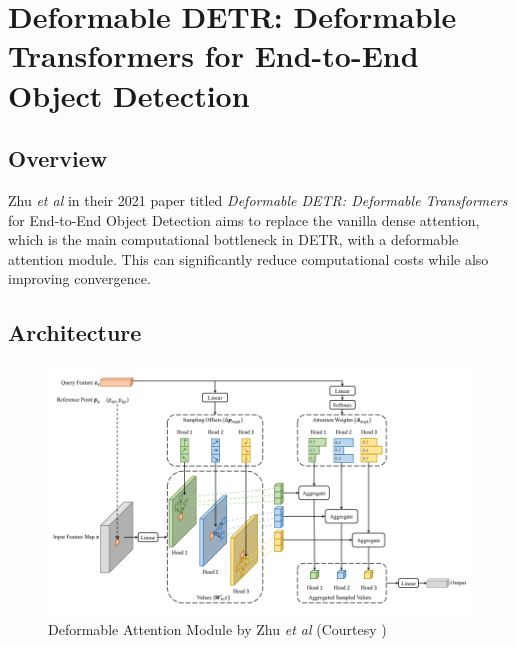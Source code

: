 \section{Deformable DETR: Deformable Transformers for End-to-End Object Detection}

\label{appendix:deformable-detr-paper}

\subsection{Overview}

\par Zhu \textit{et al} in their 2021 paper titled \textit{Deformable DETR: Deformable Transformers} for End-to-End Object Detection aims to replace the vanilla dense attention, which is the main computational bottleneck in DETR, with a deformable attention module. This can significantly reduce computational costs while also improving convergence.
\par

\subsection{Architecture}
\begin{figure}[h]
	\centering
	\includegraphics[width=\linewidth]{assets/img/deformable-attention-module.png}
	\caption{Deformable Attention Module by Zhu
		\textit{et al} (Courtesy \cite{zhu2020deformable})}
\end{figure}

